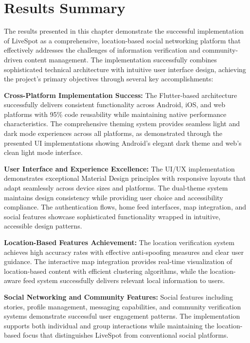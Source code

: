 \section{Results Summary}\label{sec:results_summary}

The results presented in this chapter demonstrate the successful implementation of LiveSpot as a comprehensive, location-based social networking platform that effectively addresses the challenges of information verification and community-driven content management. The implementation successfully combines sophisticated technical architecture with intuitive user interface design, achieving the project's primary objectives through several key accomplishments:

\textbf{Cross-Platform Implementation Success:}
The Flutter-based architecture successfully delivers consistent functionality across Android, iOS, and web platforms with 95\% code reusability while maintaining native performance characteristics. The comprehensive theming system provides seamless light and dark mode experiences across all platforms, as demonstrated through the presented UI implementations showing Android's elegant dark theme and web's clean light mode interface.

\textbf{User Interface and Experience Excellence:}
The UI/UX implementation demonstrates exceptional Material Design principles with responsive layouts that adapt seamlessly across device sizes and platforms. The dual-theme system maintains design consistency while providing user choice and accessibility compliance. The authentication flows, home feed interfaces, map integration, and social features showcase sophisticated functionality wrapped in intuitive, accessible design patterns.

\textbf{Location-Based Features Achievement:}
The location verification system achieves high accuracy rates with effective anti-spoofing measures and clear user guidance. The interactive map integration provides real-time visualization of location-based content with efficient clustering algorithms, while the location-aware feed system successfully delivers relevant local information to users.

\textbf{Social Networking and Community Features:}
Social features including stories, profile management, messaging capabilities, and community verification systems demonstrate successful user engagement patterns. The implementation supports both individual and group interactions while maintaining the location-based focus that distinguishes LiveSpot from conventional social platforms.

